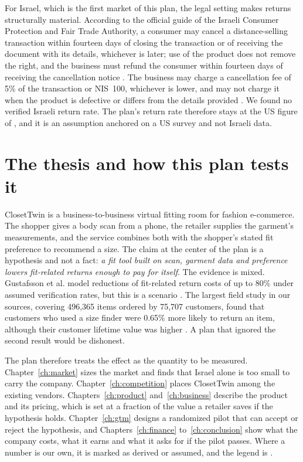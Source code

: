 For Israel, which is the first market of this plan, the legal setting makes returns structurally material. According to the official guide of the Israeli Consumer Protection and Fair Trade Authority, a consumer may cancel a distance-selling transaction within fourteen days of closing the transaction or of receiving the document with its details, whichever is later; use of the product does not remove the right, and the business must refund the consumer within fourteen days of receiving the cancellation notice \cite{il_cpfta_guide}. The business may charge a cancellation fee of 5\% of the transaction or NIS~100, whichever is lower, and may not charge it when the product is defective or differs from the details provided \cite{il_cpfta_guide}. We found no verified Israeli return rate. The plan's return rate therefore stays at the US figure of , and it is an assumption anchored on a US survey and not Israeli data.

\section{The thesis and how this plan tests it}\label{sec:thesis}

ClosetTwin is a business-to-business virtual fitting room for fashion e-commerce. The shopper gives a body scan from a phone, the retailer supplies the garment's measurements, and the service combines both with the shopper's stated fit preference to recommend a size. The claim at the center of the plan is a hypothesis and not a fact: \emph{a fit tool built on scan, garment data and preference lowers fit-related returns enough to pay for itself}. The evidence is mixed. Gustafsson et al. model reductions of fit-related return costs of up to 80\% under assumed verification rates, but this is a scenario \cite{gustafsson2021}. The largest field study in our sources, covering 496,365 items ordered by 75,707 customers, found that customers who used a size finder were 0.65\% more likely to return an item, although their customer lifetime value was higher \cite{patel2025}. A plan that ignored the second result would be dishonest.

The plan therefore treats the effect as the quantity to be measured. Chapter~\ref{ch:market} sizes the market and finds that Israel alone is too small to carry the company. Chapter~\ref{ch:competition} places ClosetTwin among the existing vendors. Chapters~\ref{ch:product} and~\ref{ch:business} describe the product and its pricing, which is set at a fraction of the value a retailer saves if the hypothesis holds. Chapter~\ref{ch:gtm} designs a randomized pilot that can accept or reject the hypothesis, and Chapters~\ref{ch:finance} to~\ref{ch:conclusion} show what the company costs, what it earns and what it asks for if the pilot passes. Where a number is our own, it is marked as derived or assumed, and the legend is \ctlegend{}.

\ctchapterend
